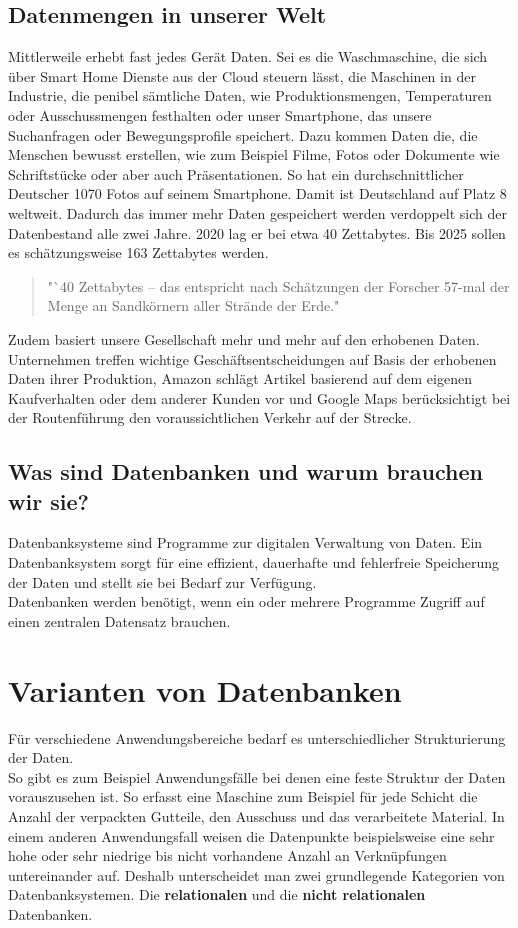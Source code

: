 \documentclass[12pt, a4paper, twoside]{article}
\begin{document}
	\subsection{Datenmengen in unserer Welt}
		Mittlerweile erhebt fast jedes Gerät Daten. Sei es die Waschmaschine, die sich über Smart Home Dienste aus der Cloud steuern lässt, die Maschinen in der Industrie, die penibel sämtliche Daten, wie Produktionsmengen, Temperaturen oder Ausschussmengen festhalten oder unser Smartphone, das unsere Suchanfragen oder Bewegungsprofile speichert. Dazu kommen Daten die, die Menschen bewusst erstellen, wie zum Beispiel Filme, Fotos oder Dokumente wie Schriftstücke oder aber auch Präsentationen. 
		So hat ein durchschnittlicher Deutscher 1070 Fotos auf seinem Smartphone. Damit ist Deutschland auf Platz 8 weltweit.\cite{Fotos:Thiele}
		Dadurch das immer mehr Daten gespeichert werden verdoppelt sich der Datenbestand alle zwei Jahre. 2020 lag er bei etwa 40 Zettabytes. Bis 2025 sollen es schätzungsweise 163 Zettabytes werden.%
		\begin{quote}
			"`40 Zettabytes – das entspricht nach Schätzungen der Forscher 57-mal der Menge an Sandkörnern aller Strände der Erde." \cite{Datenvolumen:Juengling}
		\end{quote}
		Zudem basiert unsere Gesellschaft mehr und mehr auf den erhobenen Daten. Unternehmen treffen wichtige Geschäftsentscheidungen auf Basis der erhobenen Daten ihrer Produktion, Amazon schlägt Artikel basierend auf dem eigenen Kaufverhalten oder dem anderer Kunden vor und Google Maps berücksichtigt bei der Routenführung den voraussichtlichen Verkehr auf der Strecke.\cite{DataAge:Peinsel}
		
	\subsection{Was sind Datenbanken und warum brauchen wir sie?}
		Datenbanksysteme sind Programme zur digitalen Verwaltung von Daten. Ein Datenbanksystem sorgt für eine effizient, dauerhafte und fehlerfreie Speicherung der Daten und stellt sie bei Bedarf zur Verfügung. \\
		Datenbanken werden benötigt, wenn ein oder mehrere Programme Zugriff auf einen zentralen Datensatz brauchen. 

\section{Varianten von Datenbanken}
	Für verschiedene Anwendungsbereiche bedarf es unterschiedlicher Strukturierung der Daten.\\
	So gibt es zum Beispiel Anwendungsfälle bei denen eine feste Struktur der Daten vorauszusehen ist. So erfasst eine Maschine zum Beispiel für jede Schicht die Anzahl der verpackten Gutteile, den Ausschuss und das verarbeitete Material. In einem anderen Anwendungsfall weisen die Datenpunkte beispielsweise eine sehr hohe oder sehr niedrige bis nicht vorhandene Anzahl an Verknüpfungen untereinander auf.
	Deshalb unterscheidet man zwei grundlegende Kategorien von Datenbanksystemen. Die \textbf{relationalen} und die \textbf{nicht relationalen} Datenbanken.
\end{document}
